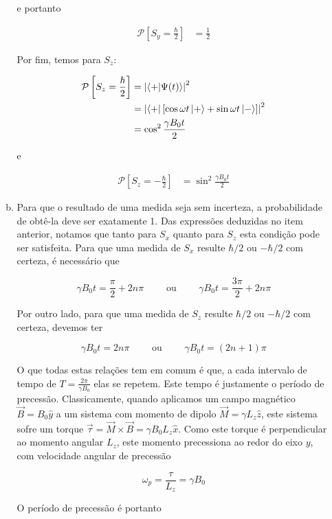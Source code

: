 \documentclass[a4paper, 12pt, notitlepage]{article}
\begin{document}
\begin{enumerate}
\begin{enumerate}[(a)]
\noindent e portanto

\begin{align*}
  \mathcal{P}\left[ S_y = \frac{\hbar}{2} \right] &= \frac{1}{2}
\end{align*}

Por fim, temos para $S_z$:

\begin{align*}
  \mathcal{P} \left[ S_z = \frac{\hslash}{2} \right] &= \left|\left\langle +| \Psi(t) \right\rangle \right|^2 \\
  &= \left| \bra{+} \left[\cos \omega t \ket{+} + \sin \omega t \ket{-} \right] \right|^2 \\
  &= \cos^2 \frac{\gamma B_0 t}{2}
\end{align*}

\noindent e

\begin{align*}
  \mathcal{P} \left[ S_z = -\frac{\hbar}{2} \right] &= \sin^2 \frac{\gamma B_0 t}{2}
\end{align*}

\item Para que o resultado de uma medida seja sem incerteza, a probabilidade de obtê-la deve ser exatamente 1. Das expressões deduzidas no item anterior, notamos que tanto para $S_x$ quanto para $S_z$ esta condição pode ser satisfeita. Para que uma medida de $S_x$ resulte $\hbar / 2$ ou $-\hbar/2$ com certeza, é necessário que

\[ \gamma B_0 t = \frac{\pi}{2} + 2n\pi \qquad \text{ ou } \qquad \gamma B_0 t = \frac{3\pi}{2} + 2n\pi \]

Por outro lado, para que uma medida de $S_z$ resulte $\hbar/2$ ou $-\hbar/2$ com certeza, devemos ter

\[ \gamma B_0 t = 2n\pi \qquad \text{ ou } \qquad \gamma B_0 t = (2n + 1) \pi \]

O que todas estas relações tem em comum é que, a cada intervalo de tempo de $T = \frac{2\pi}{\gamma B_0}$ elas se repetem. Este tempo é justamente o período de precessão. Classicamente, quando aplicamos um campo magnético $\vec{B} = B_0\hat{y}$ a um sistema com momento de dipolo $\vec{M} = \gamma L_z\hat{z}$, este sistema sofre um torque $\vec{\tau} = \vec{M} \times \vec{B} = \gamma B_0 L_z \hat{x} $. Como este torque é perpendicular ao momento angular $L_z$, este momento precessiona ao redor do eixo $y$, com velocidade angular de precessão

\[ \omega_p = \frac{\tau}{L_z} = \gamma B_0 \]

O período de precessão é portanto


\end{enumerate}
\end{enumerate}
\end{document}

